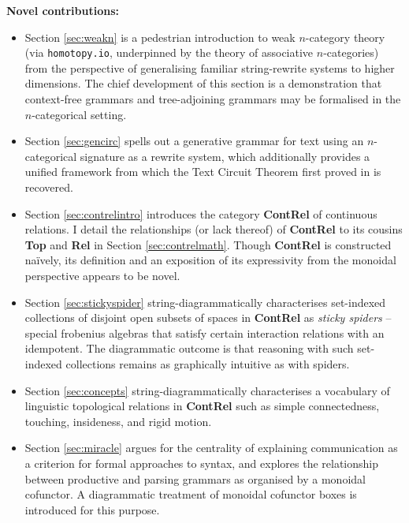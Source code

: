 \clearpage
\begin{myboxB}
\textbf{Novel contributions:}
\begin{itemize}

\item Section \ref{sec:weakn} is a pedestrian introduction to weak $n$-category theory (via \texttt{homotopy.io}, underpinned by the theory of associative $n$-categories) from the perspective of generalising familiar string-rewrite systems to higher dimensions. The chief development of this section is a demonstration that context-free grammars and tree-adjoining grammars may be formalised in the $n$-categorical setting.

\item Section \ref{sec:gencirc} spells out a generative grammar for text using an $n$-categorical signature as a rewrite system, which additionally provides a unified framework from which the Text Circuit Theorem first proved in \citep{wang-mascianica_distilling_2023} is recovered.

\item Section \ref{sec:contrelintro} introduces the category \textbf{ContRel} of continuous relations. I detail the relationships (or lack thereof) of \textbf{ContRel} to its cousins \textbf{Top} and \textbf{Rel} in Section \ref{sec:contrelmath}. Though \textbf{ContRel} is constructed na\"{i}vely, its definition and an exposition of its expressivity from the monoidal perspective appears to be novel.

\item Section \ref{sec:stickyspider} string-diagrammatically characterises set-indexed collections of disjoint open subsets of spaces in \textbf{ContRel} as \emph{sticky spiders} -- special frobenius algebras that satisfy certain interaction relations with an idempotent. The diagrammatic outcome is that reasoning with such set-indexed collections remains as graphically intuitive as with spiders.

\item Section \ref{sec:concepts} string-diagrammatically characterises a vocabulary of linguistic topological relations in \textbf{ContRel} such as simple connectedness, touching, insideness, and rigid motion.

\item Section \ref{sec:miracle} argues for the centrality of explaining communication as a criterion for formal approaches to syntax, and explores the relationship between productive and parsing grammars as organised by a monoidal cofunctor. A diagrammatic treatment of monoidal cofunctor boxes is introduced for this purpose.


\end{itemize}
\end{myboxB}
